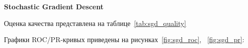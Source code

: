 \vspace{1em}
\textbf{Stochastic Gradient Descent}

Оценка качества представлена на таблице~\ref{tab:sgd_quality}

\begin{table}[h]
    \caption{Значения метрик для SGD}
    \label{tab:sgd_quality}
\end{table}

Графики ROC/PR-кривых приведены на рисунках~\ref{fig:sgd_roc}, ~\ref{fig:sgd_pr}:

